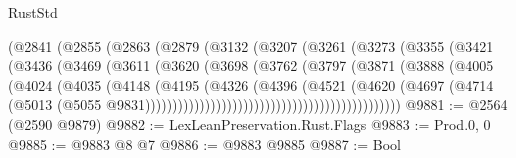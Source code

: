 \begin{lexlean}{RustStd}
\begin{coremodule}
                                  (@2841
                                    (@2855
                                      (@2863
                                        (@2879
                                          (@3132
                                            (@3207
                                              (@3261
                                                (@3273
                                                  (@3355
                                                    (@3421
                                                      (@3436
                                                        (@3469
                                                          (@3611
                                                            (@3620
                                                              (@3698
                                                                (@3762
                                                                  (@3797
                                                                    (@3871
                                                                      (@3888
                                                                        (@4005
                                                                          (@4024
                                                                            (@4035
                                                                              (@4148
                                                                                (@4195
                                                                                  (@4326
                                                                                    (@4396
                                                                                      (@4521
                                                                                        (@4620
                                                                                          (@4697
                                                                                            (@4714
                                                                                              (@5013
                                                                                                (@5055
                                                                                                  @9831)))))))))))))))))))))))))))))))))))))))))))))))
@9881 := @2564 (@2590 @9879)
@9882 := LexLeanPreservation.Rust.Flags
@9883 := Prod.{0, 0}
@9885 := @9883 @8 @7
@9886 := @9883 @9885
@9887 := Bool

\end{coremodule}
\end{lexlean}
